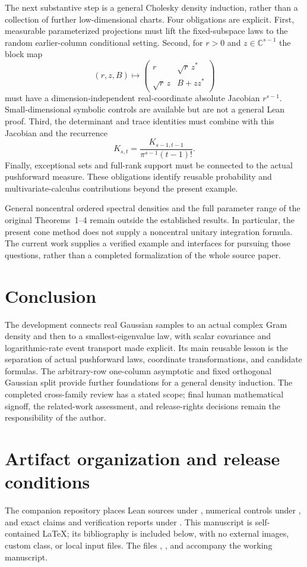 \documentclass[11pt]{article}
\newcommand{\C}{\mathbb C}
\begin{document}
The next substantive step is a general Cholesky density induction, rather than
a collection of further low-dimensional charts. Four obligations are explicit.
First, measurable parameterized projections must lift the fixed-subspace laws
to the random earlier-column conditional setting. Second, for $r>0$ and
$z\in\C^{s-1}$ the block map
\[
 (r,z,B)\longmapsto
 \begin{pmatrix}r&\sqrt r\,z^*\\\sqrt r\,z&B+zz^*\end{pmatrix}
\]
must have a dimension-independent real-coordinate absolute Jacobian
$r^{s-1}$. Small-dimensional symbolic controls are available but are not a
general Lean proof. Third, the determinant and trace identities must combine
with this Jacobian and the recurrence
\[
 K_{s,t}=\frac{K_{s-1,t-1}}{\pi^{s-1}(t-1)!}.
\]
Finally, exceptional sets and full-rank support must be connected to the
actual pushforward measure. These obligations identify reusable probability
and multivariate-calculus contributions beyond the present example.

General noncentral ordered spectral densities and the full parameter range of
the original Theorems~1--4 remain outside the established results. In
particular, the present cone method does not supply a noncentral unitary
integration formula. The current work supplies a verified example and
interfaces for pursuing those questions, rather than a completed
formalization of the whole source paper.

\section{Conclusion}
The development connects real Gaussian samples to an actual complex Gram
density and then to a smallest-eigenvalue law, with scalar covariance and
logarithmic-rate event transport made explicit. Its main reusable lesson is
the separation of actual pushforward laws, coordinate transformations, and
candidate formulas. The arbitrary-row one-column asymptotic and fixed
orthogonal Gaussian split provide further foundations for a general density
induction. The completed cross-family review has a stated scope; final human
mathematical signoff, the related-work assessment, and release-rights decisions
remain the responsibility of the author.

\appendix
\section{Artifact organization and release conditions}
The companion repository places Lean sources under
, numerical controls under
, and exact claims and verification reports under
. This manuscript is self-contained LaTeX; its bibliography
is included below, with no external images, custom class, or local input files.
The files , , and
 accompany the working manuscript.
\end{document}
